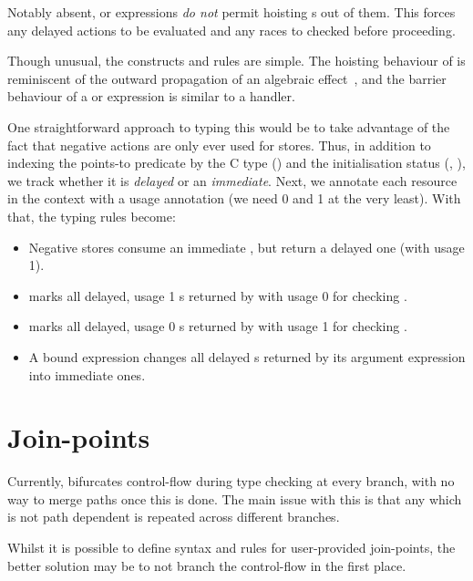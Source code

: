 Notably absent,  or  expressions
\emph{do not} permit hoisting s out of them. This forces any
delayed actions to be evaluated and any races to checked before proceeding.

Though unusual, the constructs and rules are simple. The hoisting behaviour of
 is reminiscent of the outward
propagation of an algebraic effect~, and the barrier
behaviour of a  or 
expression is similar to a handler.

One straightforward approach to typing this would be to take advantage of the fact
that negative actions are only ever used for stores. Thus, in addition to
indexing the points-to predicate  by the C type (\sm{\tau}) and the
initialisation status (, \sm{\uninitCross}), we track whether it is
\emph{delayed} or an \emph{immediate}. Next, we annotate each resource in the
context with a usage annotation (we need 0 and 1 at the very least). With that,
the typing rules
become:
\begin{itemize}
    \item Negative stores consume an immediate , but return a
        delayed one (with usage 1).
    \item {} marks all delayed, usage 1
        s returned by  with usage 0 for
        checking .
    \item {} marks all delayed, usage 0
        s returned by  with usage 1 for
        checking .
    \item A bound expression changes all delayed s
        returned by its argument expression into immediate ones.
\end{itemize}

\section{Join-points}\label{sec:join-points}

Currently,  bifurcates control-flow during type checking at every
branch, with no way to merge paths once this is done. The main issue with this
is that any  which is not path dependent is repeated
across different branches.

Whilst it is possible to define syntax and rules for user-provided join-points,
the better solution may be to not branch the control-flow in the first place.

